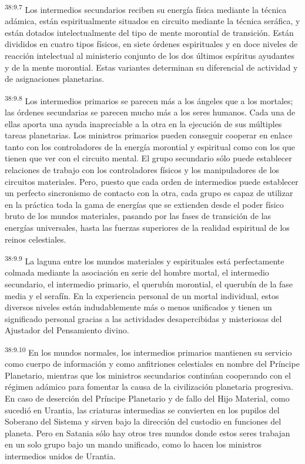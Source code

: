 \par
\textsuperscript{38:9.7} Los intermedios secundarios reciben su energía física mediante la técnica adámica, están espiritualmente situados en circuito mediante la técnica seráfica, y están dotados intelectualmente del tipo de mente morontial de transición. Están divididos en cuatro tipos físicos, en siete órdenes espirituales y en doce niveles de reacción intelectual al ministerio conjunto de los dos últimos espíritus ayudantes y de la mente morontial. Estas variantes determinan su diferencial de actividad y de asignaciones planetarias.

\par
\textsuperscript{38:9.8} Los intermedios primarios se parecen más a los ángeles que a los mortales; las órdenes secundarias se parecen mucho más a los seres humanos. Cada una de ellas aporta una ayuda inapreciable a la otra en la ejecución de sus múltiples tareas planetarias. Los ministros primarios pueden conseguir cooperar en enlace tanto con los controladores de la energía morontial y espiritual como con los que tienen que ver con el circuito mental. El grupo secundario sólo puede establecer relaciones de trabajo con los controladores físicos y los manipuladores de los circuitos materiales. Pero, puesto que cada orden de intermedios puede establecer un perfecto sincronismo de contacto con la otra, cada grupo es capaz de utilizar en la práctica toda la gama de energías que se extienden desde el poder físico bruto de los mundos materiales, pasando por las fases de transición de las energías universales, hasta las fuerzas superiores de la realidad espiritual de los reinos celestiales.

\par
\textsuperscript{38:9.9} La laguna entre los mundos materiales y espirituales está perfectamente colmada mediante la asociación en serie del hombre mortal, el intermedio secundario, el intermedio primario, el querubín morontial, el querubín de la fase media y el serafín. En la experiencia personal de un mortal individual, estos diversos niveles están indudablemente más o menos unificados y tienen un significado personal gracias a las actividades desapercibidas y misteriosas del Ajustador del Pensamiento divino.

\par
\textsuperscript{38:9.10} En los mundos normales, los intermedios primarios mantienen su servicio como cuerpo de información y como anfitriones celestiales en nombre del Príncipe Planetario, mientras que los ministros secundarios continúan cooperando con el régimen adámico para fomentar la causa de la civilización planetaria progresiva. En caso de deserción del Príncipe Planetario y de fallo del Hijo Material, como sucedió en Urantia, las criaturas intermedias se convierten en los pupilos del Soberano del Sistema y sirven bajo la dirección del custodio en funciones del planeta. Pero en Satania sólo hay otros tres mundos donde estos seres trabajan en un solo grupo bajo un mando unificado, como lo hacen los ministros intermedios unidos de Urantia.

